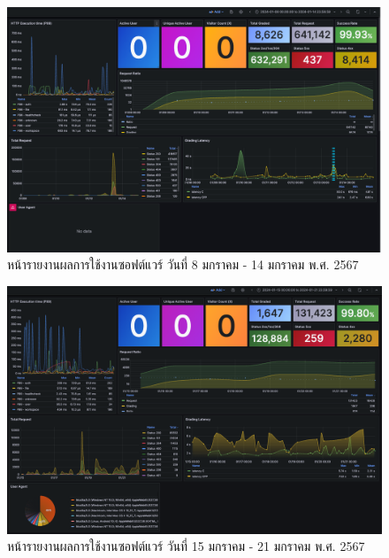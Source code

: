 \documentclass[12pt,one side,openright,a4paper]{cpe-thesis-th}
\begin{document}
\pagebreak


\begin{figure}[H]
    \centering
    \includegraphics[width=15cm]{figure/results/grafana/grafana-jan08-jan14.png}
    \caption[หน้ารายงานผลการใช้งานซอฟต์แวร์ วันที่ 8 มกราคม - 14 มกราคม พ.ศ. 2567]{หน้ารายงานผลการใช้งานซอฟต์แวร์ วันที่ 8 มกราคม - 14 มกราคม พ.ศ. 2567}
    \label{fig:res-grafana-j08j14}
\end{figure}

\begin{figure}[H]
    \centering
    \includegraphics[width=15cm]{figure/results/grafana/grafana-jan15-jan21.png}
    \caption[หน้ารายงานผลการใช้งานซอฟต์แวร์ วันที่ 15 มกราคม - 21 มกราคม พ.ศ. 2567]{หน้ารายงานผลการใช้งานซอฟต์แวร์ วันที่ 15 มกราคม - 21 มกราคม พ.ศ. 2567}
    \label{fig:res-grafana-j15j21}
\end{figure}
\end{document}
